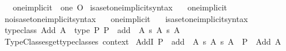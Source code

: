 \begin{isabellebody}
\ \ \ {\isachardoublequoteopen}one{\isacharunderscore}{\kern0pt}implicit\ {\isasymequiv}\ one\ {\isasymimplicit}O{\isachardoublequoteclose}\isanewline
\isanewline
{}\isamarkupfalse%
\ isa{\isacharunderscore}{\kern0pt}set{\isacharunderscore}{\kern0pt}one{\isacharunderscore}{\kern0pt}implicit{\isacharunderscore}{\kern0pt}syntax\ \ \isamarkupfalse%
\ one{\isacharunderscore}{\kern0pt}implicit\ {\isacharparenleft}{\kern0pt}{\isachardoublequoteopen}{}{\isachardoublequoteclose}{\isacharparenright}{\kern0pt}\ \isamarkupfalse%
\isanewline
{}\isamarkupfalse%
\ no{\isacharunderscore}{\kern0pt}isa{\isacharunderscore}{\kern0pt}set{\isacharunderscore}{\kern0pt}one{\isacharunderscore}{\kern0pt}implicit{\isacharunderscore}{\kern0pt}syntax\ \ \isamarkupfalse%
\ one{\isacharunderscore}{\kern0pt}implicit\ {\isacharparenleft}{\kern0pt}{\isachardoublequoteopen}{}{\isachardoublequoteclose}{\isacharparenright}{\kern0pt}\ \isamarkupfalse%
\isanewline
\isanewline
{}\isamarkupfalse%
\ isa{\isacharunderscore}{\kern0pt}set{\isacharunderscore}{\kern0pt}one{\isacharunderscore}{\kern0pt}implicit{\isacharunderscore}{\kern0pt}syntax%
\isadelimdocument
%
\endisadelimdocument
%
\isatagdocument
%
\isamarkuptrue%
%
\endisatagdocument
{\isafolddocument}%
%
\isadelimdocument
%
\endisadelimdocument
{}\isamarkupfalse%
\ {\isacharbrackleft}{\kern0pt}typeclass{\isacharbrackright}{\kern0pt}{\isacharcolon}{\kern0pt}\ {\isachardoublequoteopen}Add\ A\ {\isasymequiv}\ type\ {\isacharparenleft}{\kern0pt}{\isasymlambda}P{\isachardot}{\kern0pt}\ P\ {\isacharat}{\kern0pt}{\isacharat}{\kern0pt}\ add\ {\isacharcolon}{\kern0pt}\ A\ {\isasymrightarrow}s\ A\ {\isasymrightarrow}s\ A{\isacharparenright}{\kern0pt}{\isachardoublequoteclose}\isanewline
\isanewline
%
\isanewline
%
\isadelimML
%
\endisadelimML
%
\isatagML
{}\isamarkupfalse%
\ {\isacartoucheopen}Type{\isacharunderscore}{\kern0pt}Classes{\isachardot}{\kern0pt}get{\isacharunderscore}{\kern0pt}type{\isacharunderscore}{\kern0pt}classes\ {\isacharat}{\kern0pt}{\isacharbraceleft}{\kern0pt}context{\isacharbraceright}{\kern0pt}{\isacartoucheclose}%
\endisatagML
{\isafoldML}%
%
\isadelimML
\isanewline
%
\endisadelimML
\isanewline
{}\isamarkupfalse%
\ AddI{\isacharcolon}{\kern0pt}\ {\isachardoublequoteopen}P\ {\isacharat}{\kern0pt}{\isacharat}{\kern0pt}\ add\ {\isacharcolon}{\kern0pt}\ A\ {\isasymrightarrow}s\ A\ {\isasymrightarrow}s\ A\ {\isasymLongrightarrow}\ P\ {\isacharcolon}{\kern0pt}\ Add\ A{\isachardoublequoteclose}\isanewline

\end{isabellebody}
